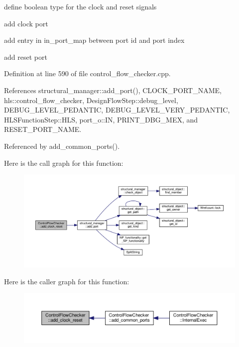 define boolean type for the clock and reset signals

add clock port

add entry in in\+\_\+port\+\_\+map between port id and port index

add reset port 

Definition at line 590 of file control\+\_\+flow\+\_\+checker.\+cpp.



References structural\+\_\+manager\+::add\+\_\+port(), C\+L\+O\+C\+K\+\_\+\+P\+O\+R\+T\+\_\+\+N\+A\+ME, hls\+::control\+\_\+flow\+\_\+checker, Design\+Flow\+Step\+::debug\+\_\+level, D\+E\+B\+U\+G\+\_\+\+L\+E\+V\+E\+L\+\_\+\+P\+E\+D\+A\+N\+T\+IC, D\+E\+B\+U\+G\+\_\+\+L\+E\+V\+E\+L\+\_\+\+V\+E\+R\+Y\+\_\+\+P\+E\+D\+A\+N\+T\+IC, H\+L\+S\+Function\+Step\+::\+H\+LS, port\+\_\+o\+::\+IN, P\+R\+I\+N\+T\+\_\+\+D\+B\+G\+\_\+\+M\+EX, and R\+E\+S\+E\+T\+\_\+\+P\+O\+R\+T\+\_\+\+N\+A\+ME.



Referenced by add\+\_\+common\+\_\+ports().

Here is the call graph for this function\+:
\nopagebreak
\begin{figure}[H]
\begin{center}
\leavevmode
\includegraphics[width=350pt]{d0/dea/classControlFlowChecker_a0871b9dfdf0f1875f8e61da585bdc2f3_cgraph}
\end{center}
\end{figure}
Here is the caller graph for this function\+:
\nopagebreak
\begin{figure}[H]
\begin{center}
\leavevmode
\includegraphics[width=350pt]{d0/dea/classControlFlowChecker_a0871b9dfdf0f1875f8e61da585bdc2f3_icgraph}
\end{center}
\end{figure}
\mbox{\label{classControlFlowChecker_ab2feb53a8bf9a796c2d693083fd16944}} 
